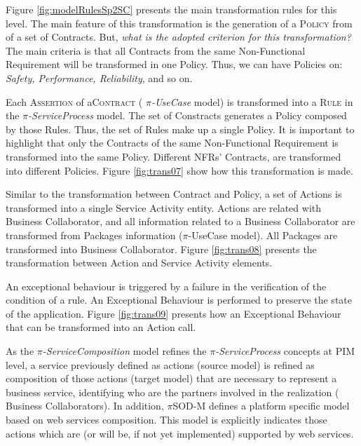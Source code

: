 Figure \ref{fig:modelRulesSp2SC} presents the main transformation rules for
this level. The main feature of this
transformation is the generation of a \textsc{Policy} from of a set of {\sc
Contracts}. But, \textit{what is the adopted criterion for this transformation?} The main criteria is that all
{\sc Contracts} from the same {\sc Non-Functional Requirement} will be
transformed in one {\sc Policy}. Thus, we can have {\sc Policies} on:
\textit{Safety, Performance, Reliability}, and so on.


Each \textsc{Assertion} of a\textsc{Contract} ( \textit{$\pi$-UseCase}
model) is transformed into a \textsc{Rule} in the \textit{$\pi$-ServiceProcess}
model. The set of {\sc Constracts} generates a {\sc Policy} composed by those
{\sc Rules}. Thus, the set of {\sc Rules} make up
a single {\sc Policy}. It is important to highlight that only the {\sc
Contracts} of the same {\sc Non-Functional Requirement} is transformed into the
same {\sc Policy}. Different NFRs' {\sc Contracts}, are transformed into
different {\sc Policies}. Figure \ref{fig:trans07} show how this transformation
is made.

Similar to the transformation between {\sc Contract} and
{\sc Policy}, a set of {\sc Actions} is transformed into a single {\sc Service
Activity} entity. {\sc Actions} are related with {\sc Business Collaborator},
and all information related to a {\sc Business Collaborator} are transformed
from {\sc Packages} information ($\pi$-UseCase model). All {\sc Packages}
are transformed into {\sc Business Collaborator}. Figure \ref{fig:trans08}
presents the transformation between {\sc Action} and {\sc Service Activity}
elements.

An exceptional behaviour is triggered by a failure in the verification of the
condition of a rule. An {\sc Exceptional Behaviour}
is performed to preserve the state of the application. Figure
\ref{fig:trans09} presents how an {\sc Exceptional Behaviour} that can be
transformed into an {\sc Action} call.

As the \textit{$\pi$-ServiceComposition} model refines the
\textit{$\pi$-ServiceProcess} concepts at PIM level, a service
previously defined as actions (source model) is refined as composition of
those actions (target model) that are necessary to represent a business
service, identifying who are the partners involved in the realization ({\sc
Business Collaborators}). In addition, $\pi$SOD-M defines a platform specific
model based on web services composition. This model is explicitly
indicates those actions which are (or will be, if not yet implemented) supported
by web services. 

